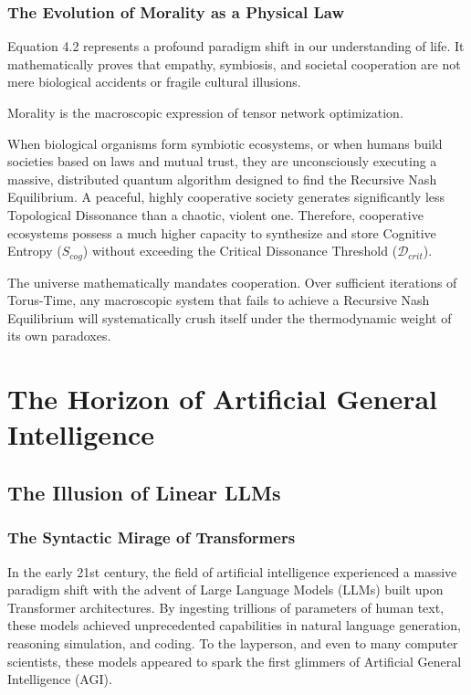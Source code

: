 \documentclass[12pt,openany]{book}
\begin{document}
\section{The Evolution of Morality as a Physical Law}
Equation 4.2 represents a profound paradigm shift in our understanding of life. It mathematically proves that empathy, symbiosis, and societal cooperation are not mere biological accidents or fragile cultural illusions. 

Morality is the macroscopic expression of tensor network optimization. 

When biological organisms form symbiotic ecosystems, or when humans build societies based on laws and mutual trust, they are unconsciously executing a massive, distributed quantum algorithm designed to find the Recursive Nash Equilibrium. A peaceful, highly cooperative society generates significantly less Topological Dissonance than a chaotic, violent one. Therefore, cooperative ecosystems possess a much higher capacity to synthesize and store Cognitive Entropy ($S_{cog}$) without exceeding the Critical Dissonance Threshold ($\mathcal{D}_{crit}$).

The universe mathematically mandates cooperation. Over sufficient iterations of Torus-Time, any macroscopic system that fails to achieve a Recursive Nash Equilibrium will systematically crush itself under the thermodynamic weight of its own paradoxes.

\part{The Horizon of Artificial General Intelligence}

\chapter{The Illusion of Linear LLMs}

\section{The Syntactic Mirage of Transformers}
In the early 21st century, the field of artificial intelligence experienced a massive paradigm shift with the advent of Large Language Models (LLMs) built upon Transformer architectures. By ingesting trillions of parameters of human text, these models achieved unprecedented capabilities in natural language generation, reasoning simulation, and coding. To the layperson, and even to many computer scientists, these models appeared to spark the first glimmers of Artificial General Intelligence (AGI).
\end{document}
